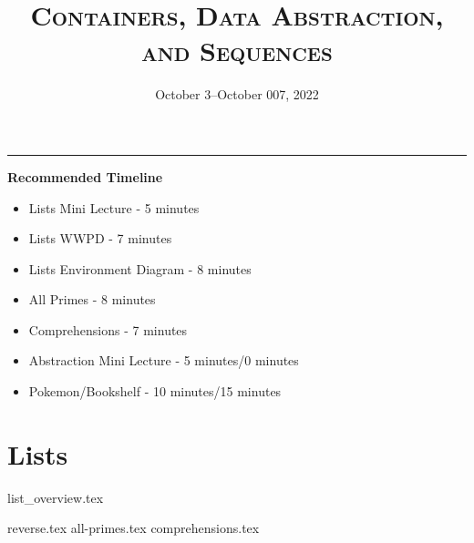 \documentclass{exam}
\title{\textsc{Containers, Data Abstraction, and Sequences}}
\date{October 3--October 007, 2022}
\begin{document}
\maketitle
\rule{\textwidth}{0.15em}
\fontsize{12}{15}\selectfont


\begin{guide}
    \textbf{Recommended Timeline}
    \begin{itemize}
        \item Lists Mini Lecture - 5 minutes
        \item Lists WWPD - 7 minutes
        \item Lists Environment Diagram - 8 minutes
        \item All Primes - 8 minutes
        \item Comprehensions - 7 minutes
        \item Abstraction Mini Lecture - 5 minutes/0 minutes
        \item Pokemon/Bookshelf - 10 minutes/15 minutes
    \end{itemize}
\end{guide}

\section{Lists}
{list_overview.tex}
\begin{questions}
    {reverse.tex}
    \newpage %
    {all-primes.tex}
    {comprehensions.tex}
\end{questions}

\newpage
\end{document}
